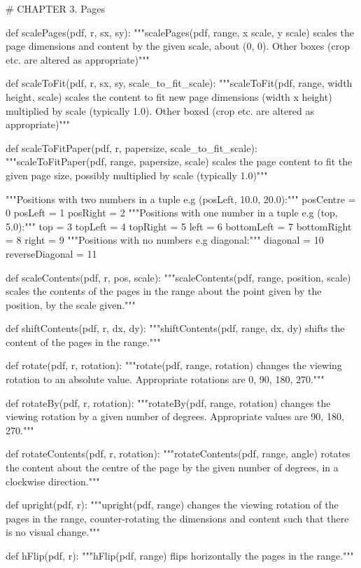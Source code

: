 # CHAPTER 3. Pages

def scalePages(pdf, r, sx, sy):
    """scalePages(pdf, range, x scale, y scale) scales the page dimensions
    and content by the given scale, about (0, 0). Other boxes (crop etc. are
    altered as appropriate)"""

def scaleToFit(pdf, r, sx, sy, scale_to_fit_scale):
    """scaleToFit(pdf, range, width height, scale) scales the content to fit
    new page dimensions (width x height) multiplied by scale (typically 1.0).
    Other boxed (crop etc. are altered as appropriate)"""

def scaleToFitPaper(pdf, r, papersize, scale_to_fit_scale):
    """scaleToFitPaper(pdf, range, papersize, scale) scales the page content
    to fit the given page size, possibly multiplied by scale (typically 1.0)"""

"""Positions with two numbers in a tuple e.g (posLeft, 10.0, 20.0):"""
posCentre = 0
posLeft = 1
posRight = 2
"""Positions with one number in a tuple e.g (top, 5.0):"""
top = 3
topLeft = 4
topRight = 5
left = 6
bottomLeft = 7
bottomRight = 8
right = 9
"""Positions with no numbers e.g diagonal:"""
diagonal = 10
reverseDiagonal = 11

def scaleContents(pdf, r, pos, scale):
    """scaleContents(pdf, range, position, scale) scales the contents of the
    pages in the range about the point given by the position, by the
    scale given."""

def shiftContents(pdf, r, dx, dy):
    """shiftContents(pdf, range, dx, dy) shifts the content of the pages in
    the range."""

def rotate(pdf, r, rotation):
    """rotate(pdf, range, rotation) changes the viewing rotation to an
    absolute value. Appropriate rotations are 0, 90, 180, 270."""

def rotateBy(pdf, r, rotation):
    """rotateBy(pdf, range, rotation) changes the viewing rotation by a
    given number of degrees. Appropriate values are 90, 180, 270."""

def rotateContents(pdf, r, rotation):
    """rotateContents(pdf, range, angle) rotates the content about the centre
    of the page by the given number of degrees, in a clockwise direction."""

def upright(pdf, r):
    """upright(pdf, range) changes the viewing rotation of the pages in the
    range, counter-rotating the dimensions and content such that there is no
    visual change."""

def hFlip(pdf, r):
    """hFlip(pdf, range) flips horizontally the pages in the range."""

